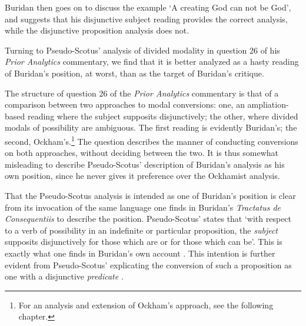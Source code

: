 	Buridan then goes on to discuss the example `A creating God can not be God', and suggests that his disjunctive subject reading provides the correct analysis, while the disjunctive proposition analysis does not.
	
	Turning to Pseudo-Scotus' analysis of divided modality in question 26 of his \textit{Prior Analytics} commentary, we find that it is better analyzed as a hasty reading of Buridan's position, at worst, than as the target of Buridan's critique. 
	
	The structure of question 26 of the \textit{Prior Analytics} commentary is that of a comparison between two approaches to modal conversions: one, an ampliation-based reading where the subject supposits disjunctively; the other, where divided modals of possibility are ambiguous. The first reading is evidently Buridan's; the second, Ockham's.\footnote{For an analysis and extension of Ockham's approach, see the following chapter.} The question describes the manner of conducting conversions on both approaches, without deciding between the two. It is thus somewhat misleading to describe Pseudo-Scotus' description of Buridan's analysis as his own position, since he never gives it preference over the Ockhamist analysis.
	
	That the Pseudo-Scotus analysis is intended as one of Buridan's position is clear from its invocation of the same language one finds in Buridan's \textit{Tractatus de Consequentiis} to describe the position. Pseudo-Scotus' states that `with respect to a verb of possibility in an indefinite or particular proposition, the \textit{subject} supposits disjunctively for those which are or for those which can be'\cite[I, q. 26, p. 143]{Pseudo-Scotus1891}. This is exactly what one finds in Buridan's own account \cite[II. 4, p. 97]{Buridan2015}. This intention is further evident from Pseudo-Scotus' explicating the conversion of such a proposition as one with a disjunctive \textit{predicate} \cite[I, q. 26, p. 145]{Pseudo-Scotus1891}. 
	

